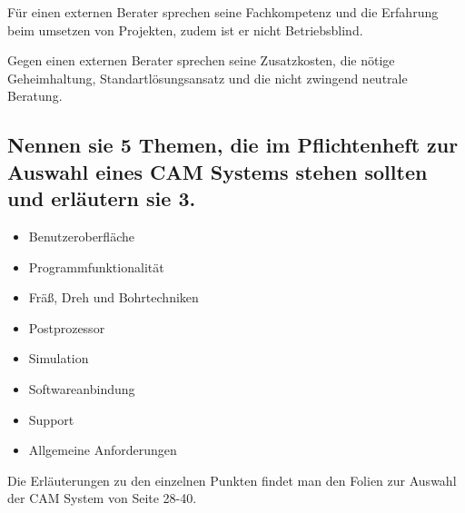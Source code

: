 Für einen externen Berater sprechen seine Fachkompetenz und die Erfahrung beim umsetzen von Projekten, zudem ist er nicht Betriebsblind.

Gegen einen externen Berater sprechen seine Zusatzkosten, die nötige Geheimhaltung, Standartlösungsansatz und die nicht zwingend neutrale Beratung.


\subsection*{
Nennen sie 5 Themen, die im Pflichtenheft zur Auswahl eines CAM Systems stehen sollten und erläutern sie 3.
}

\begin{itemize}
\item Benutzeroberfläche
\item Programmfunktionalität
\item Fräß, Dreh und Bohrtechniken
\item Postprozessor
\item Simulation
\item Softwareanbindung
\item Support
\item Allgemeine Anforderungen
\end{itemize}

Die Erläuterungen zu den einzelnen Punkten findet man den Folien zur Auswahl der CAM System von Seite 28-40.



